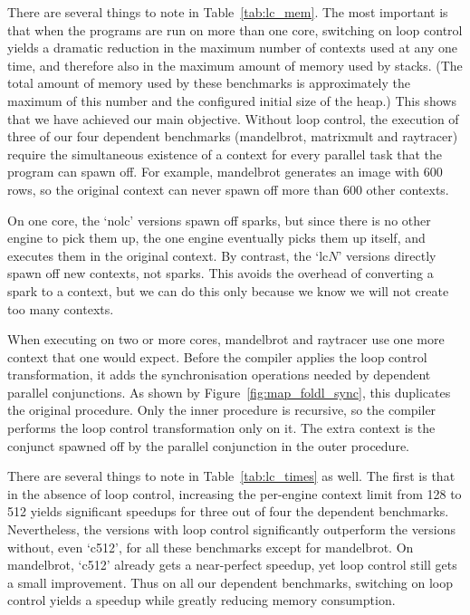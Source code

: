 There are several things to note in Table~\ref{tab:lc_mem}.
The most important is that when the programs are run on more than one core,
switching on loop control yields a dramatic reduction
in the maximum number of contexts used at any one time,
and therefore also in the maximum amount of memory used by stacks.
(The total amount of memory used by these benchmarks
is approximately the maximum of this number
and the configured initial size of the heap.)
This shows that we have achieved our main objective.
Without loop control, the execution of
three of our four dependent benchmarks (mandelbrot, matrixmult and raytracer)
require the simultaneous existence of a context
for every parallel task that the program can spawn off.
For example, mandelbrot generates an image with 600 rows,
so the original context can never spawn off more than 600 other contexts.

On one core, the `nolc' versions spawn off sparks,
but since there is no other engine to pick them up,
the one engine eventually picks them up itself,
and executes them in the original context.
By contrast, the `lc$N$' versions directly spawn off new contexts, not sparks.
This avoids the overhead of converting a spark to a context,
but we can do this only because we know we will not create too many contexts.

When executing on two or more cores,
mandelbrot and raytracer use one more context that one would expect.
Before the compiler applies the loop control transformation,
it adds the synchronisation operations
needed by dependent parallel conjunctions.
As shown by Figure~\ref{fig:map_foldl_sync},
this duplicates the original procedure.
Only the inner procedure is recursive,
so the compiler performs the loop control transformation only on it.
The extra context is
the conjunct spawned off by the parallel conjunction in the outer procedure.

There are several things to note in Table~\ref{tab:lc_times} as well.
The first is that in the absence of loop control,
increasing the per-engine context limit from 128 to 512
yields significant speedups for three out of four the dependent benchmarks.
Nevertheless, the versions with loop control
significantly outperform the versions without, even `c512',
for all these benchmarks except for mandelbrot.
On mandelbrot, `c512' already gets a near-perfect speedup,
yet loop control still gets a small improvement.
Thus on all our dependent benchmarks,
switching on loop control yields a speedup
while greatly reducing memory consumption.

